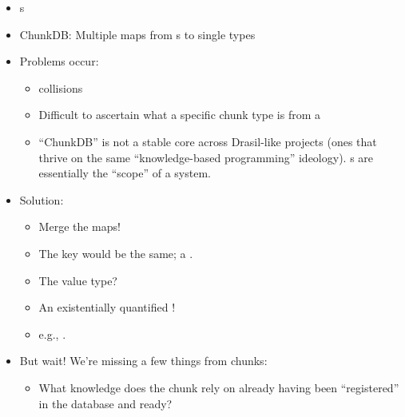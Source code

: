 \begin{itemize}

      \item \UID{}s

      \item ChunkDB: Multiple maps from \UID{}s to single types

      \item Problems occur:
            \begin{itemize}

                  \item \UID{} collisions

                  \item Difficult to ascertain what a specific chunk type is
                        from a \UID{}

                  \item ``ChunkDB'' is not a stable core across Drasil-like
                        projects (ones that thrive on the same ``knowledge-based
                        programming'' ideology). \ChunkDB{}s are essentially the
                        ``scope'' of a system.

            \end{itemize}

      \item Solution:
            \begin{itemize}

                  \item Merge the maps!

                  \item The key would be the same; a \UID{}.

                  \item The value type?

                  \item An existentially quantified !

                  \item e.g., .

            \end{itemize}

      \item But wait! We're missing a few things from chunks:
            \begin{itemize}

                  \item What knowledge does the chunk rely on already having
                        been ``registered'' in the database and ready?


\end{itemize}
\end{itemize}
